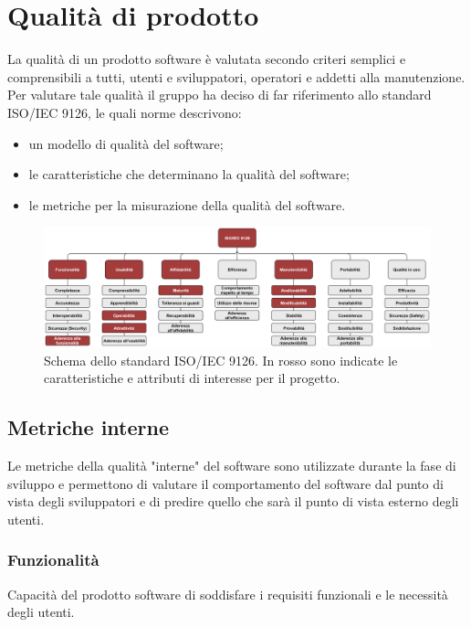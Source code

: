 
\section{Qualità di prodotto}
La qualità di un prodotto software è valutata secondo criteri semplici e comprensibili a tutti, utenti e sviluppatori, operatori e addetti alla manutenzione.
Per valutare tale qualità il gruppo \Gruppo{} ha deciso di far riferimento allo standard ISO/IEC 9126, le quali norme descrivono:
\begin{itemize}
\item un modello di qualità del software; 
\item le caratteristiche che determinano la qualità del software;
\item le metriche per la misurazione della qualità del software.
\end{itemize}

\begin{figure}[h]
    \centering
    \includegraphics[scale=0.53]{sezioni/Immagini/Iso_Iec_9126.png}
    \caption{Schema dello standard ISO/IEC 9126. In rosso sono indicate le caratteristiche e attributi di interesse per il progetto.}
\end{figure}

\subsection{Metriche interne}
 Le metriche della qualità "interne" del software sono utilizzate durante la fase di sviluppo e permettono di valutare il comportamento del software dal punto di vista degli sviluppatori e di predire quello che sarà il punto di vista esterno degli utenti.
  \subsubsection{Funzionalità}
      Capacità del prodotto software di soddisfare i requisiti funzionali e le necessità degli utenti.

